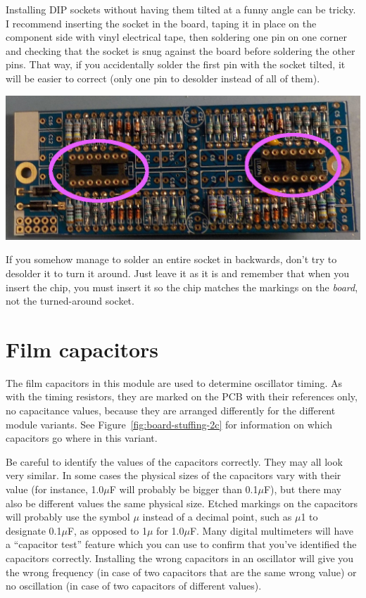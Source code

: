Installing DIP sockets without having them tilted at a funny angle can be
tricky.  I recommend inserting the socket in the board, taping it in place
on the component side with vinyl electrical tape, then soldering one pin on
one corner and checking that the socket is snug against the board before
soldering the other pins.  That way, if you accidentally solder the first
pin with the socket tilted, it will be easier to correct (only one pin to
desolder instead of all of them).

\noindent\includegraphics[width=\linewidth]{dip-2C.jpg}

If you somehow manage to solder an entire socket in backwards, don't try to
desolder it to turn it around.  Just leave it as it is and remember that
when you insert the chip, you must insert it so the chip matches the
markings on the \emph{board}, not the turned-around socket.

\section{Film capacitors}

The film capacitors in this module are used to determine oscillator timing. 
As with the timing resistors, they are marked on the PCB with their
references only, no capacitance values, because they are arranged
differently for the different module variants.  See
Figure~\ref{fig:board-stuffing-2c} for information on which capacitors go
where in this variant.

Be careful to identify the values of the capacitors correctly.  They may all
look very similar.  In some cases the physical sizes of the capacitors vary
with their value (for instance, 1.0$\mu$F will probably be bigger than
0.1$\mu$F), but there may also be different values the same physical size. 
Etched markings on the capacitors will probably use the symbol $\mu$ instead
of a decimal point, such as $\mu$1 to designate 0.1$\mu$F, as opposed to
1$\mu$ for 1.0$\mu$F.  Many digital multimeters will have a ``capacitor
test'' feature which you can use to confirm that you've identified the
capacitors correctly.  Installing the wrong capacitors in an oscillator
will give you the wrong frequency (in case of two capacitors that are the
same wrong value) or no oscillation (in case of two capacitors of different
values).


